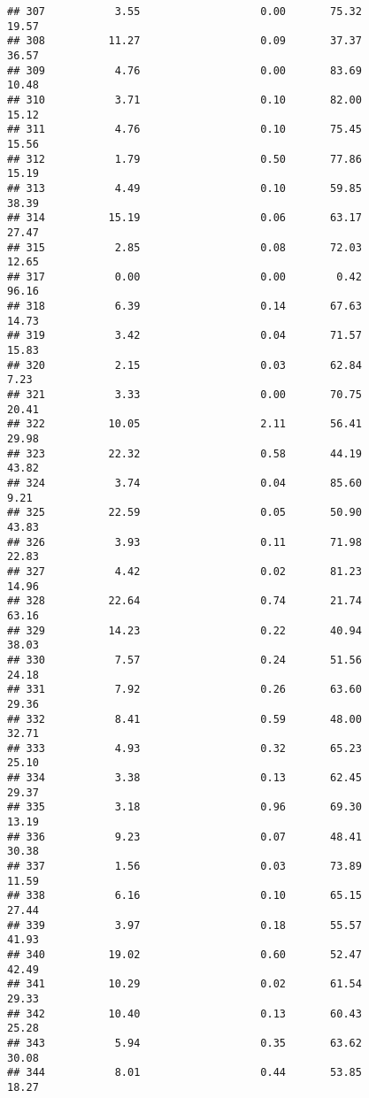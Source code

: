 \documentclass[
]{article}
\begin{document}
\begin{verbatim}
## 307           3.55                   0.00       75.32          19.57
## 308          11.27                   0.09       37.37          36.57
## 309           4.76                   0.00       83.69          10.48
## 310           3.71                   0.10       82.00          15.12
## 311           4.76                   0.10       75.45          15.56
## 312           1.79                   0.50       77.86          15.19
## 313           4.49                   0.10       59.85          38.39
## 314          15.19                   0.06       63.17          27.47
## 315           2.85                   0.08       72.03          12.65
## 317           0.00                   0.00        0.42          96.16
## 318           6.39                   0.14       67.63          14.73
## 319           3.42                   0.04       71.57          15.83
## 320           2.15                   0.03       62.84           7.23
## 321           3.33                   0.00       70.75          20.41
## 322          10.05                   2.11       56.41          29.98
## 323          22.32                   0.58       44.19          43.82
## 324           3.74                   0.04       85.60           9.21
## 325          22.59                   0.05       50.90          43.83
## 326           3.93                   0.11       71.98          22.83
## 327           4.42                   0.02       81.23          14.96
## 328          22.64                   0.74       21.74          63.16
## 329          14.23                   0.22       40.94          38.03
## 330           7.57                   0.24       51.56          24.18
## 331           7.92                   0.26       63.60          29.36
## 332           8.41                   0.59       48.00          32.71
## 333           4.93                   0.32       65.23          25.10
## 334           3.38                   0.13       62.45          29.37
## 335           3.18                   0.96       69.30          13.19
## 336           9.23                   0.07       48.41          30.38
## 337           1.56                   0.03       73.89          11.59
## 338           6.16                   0.10       65.15          27.44
## 339           3.97                   0.18       55.57          41.93
## 340          19.02                   0.60       52.47          42.49
## 341          10.29                   0.02       61.54          29.33
## 342          10.40                   0.13       60.43          25.28
## 343           5.94                   0.35       63.62          30.08
## 344           8.01                   0.44       53.85          18.27

\end{verbatim}
\end{document}
